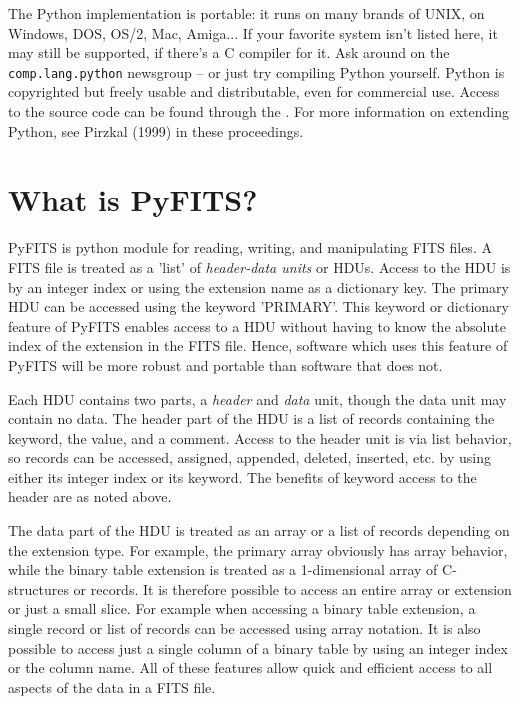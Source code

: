 The Python implementation is portable: it runs on many brands of UNIX,
on Windows, DOS, OS/2, Mac, Amiga...  If your favorite system isn't
listed here, it may still be supported, if there's a C compiler for
it.  Ask around on the {\tt comp.lang.python} newsgroup -- or just try compiling Python
yourself.  Python is copyrighted but freely usable and distributable, even for
commercial use.  Access to the source code can be found through the 
.  For more information on 
extending Python, see Pirzkal (1999) in these proceedings.


\section{What is PyFITS?}

PyFITS is python module for reading, writing, and manipulating FITS
files.  A FITS file is treated as a 'list' of {\em header-data units}
or HDUs.  Access to the HDU is by an integer index or using the
extension name as a dictionary key.  The primary HDU can be accessed
using the keyword 'PRIMARY'.  This keyword or dictionary feature of
PyFITS enables access to a HDU without having to know the absolute
index of the extension in the FITS file.  Hence, software which uses
this feature of PyFITS will be more robust and portable than
software that does not.

Each HDU contains two parts, a {\em header} and {\em data} unit,
though the data unit may contain no data.  The header part of the HDU
is a list of records containing the keyword, the value, and a
comment.  Access to the header unit is via list behavior, so records
can be accessed, assigned, appended, deleted, inserted, etc. by using
either its integer index or its keyword.  The benefits of keyword
access to the header are as noted above.

The data part of the HDU is treated as an array or a list of records
depending on the extension type.  For example, the primary array
obviously has array behavior, while the binary table extension is
treated as a 1-dimensional array of C-structures or records.  It is
therefore possible to access an entire array or extension or just a
small slice.  For example when accessing a binary table extension, a
single record or list of records can be accessed using array notation.
It is also possible to access just a single column of a binary table
by using an integer index or the column name.  All of these features
allow quick and efficient access to all aspects of the data in a FITS
file.


